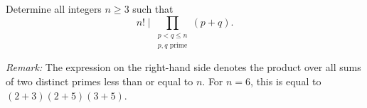 Determine all integers $n\geq 3$ such that
$$n!\mid \prod_{\substack{p<q\leq n\\ p,q \text{ prime}}}(p+q).$$

\emph{Remark:} The expression on the right-hand side denotes the product
over all sums of two distinct primes less than or equal to $n$.
For $n = 6$, this is equal to $(2+3)(2+5)(3+5)$.
